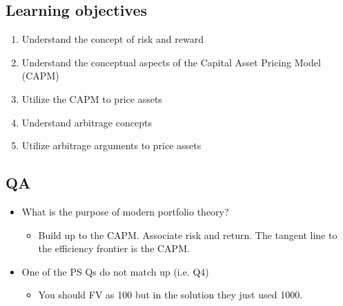\subsection{Learning objectives}
\begin{definition}
    \begin{enumerate}
        \item Understand the concept of risk and reward
        \item Understand the conceptual aspects of the Capital Asset Pricing Model (CAPM)
        \item Utilize the CAPM to price assets
        \item Understand arbitrage concepts
        \item Utilize arbitrage arguments to price assets    
    \end{enumerate}
\end{definition}

\subsection{QA}
\begin{intuition}
    \begin{itemize}
        \item What is the purpose of modern portfolio theory?
        \begin{itemize}
            \item Build up to the CAPM. Associate risk and return. The tangent line to the efficiency frontier is the CAPM. 
        \end{itemize}
        \item One of the PS Qs do not match up (i.e. Q4)
        \begin{itemize}
            \item You should FV as 100 but in the solution they just used 1000. 
        \end{itemize}
    \end{itemize}
\end{intuition}

